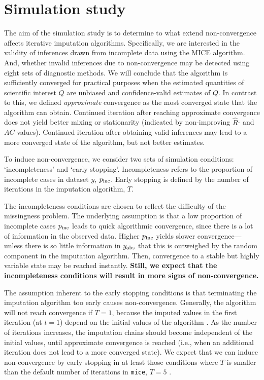 \documentclass[Royal,times,sageh]{sagej}
\begin{document}
\hypertarget{simulation-study}{%
\section{Simulation study}\label{simulation-study}}

The aim of the simulation study is to determine to what extend non-convergence affects iterative imputation algorithms. Specifically, we are interested in the validity of inferences drawn from incomplete data using the MICE algorithm. And, whether invalid inferences due to non-convergence may be detected using eight sets of diagnostic methods. We will conclude that the algorithm is sufficiently converged for practical purposes when the estimated quantities of scientific interest \(\bar{Q}\) are unbiased and confidence-valid estimates of \({Q}\). In contrast to this, we defined \emph{approximate} convergence as the most converged state that the algorithm can obtain. Continued iteration after reaching approximate convergence does not yield better mixing or stationarity (indicated by non-improving \(\widehat{R}\)- and \(AC\)-values). Continued iteration after obtaining valid inferences may lead to a more converged state of the algorithm, but not better estimates.

To induce non-convergence, we consider two sets of simulation conditions: `incompleteness' and `early stopping'. Incompleteness refers to the proportion of incomplete cases in dataset \(y\), \(p_{\rm inc}\). Early stopping is defined by the number of iterations in the imputation algorithm, \(T\).

The incompleteness conditions are chosen to reflect the difficulty of the missingness problem. The underlying assumption is that a low proportion of incomplete cases \(p_{\rm inc}\) leads to quick algorithmic convergence, since there is a lot of information in the observed data. Higher \(p_{\rm inc}\) yields slower convergence---unless there is so little information in \(y_{\rm obs}\) that this is outweighed by the random component in the imputation algorithm. Then, convergence to a stable but highly variable state may be reached instantly. \textbf{Still, we expect that the incompleteness conditions will result in more signs of non-convergence.}

The assumption inherent to the early stopping conditions is that terminating the imputation algorithm too early causes non-convergence. Generally, the algorithm will not reach convergence if \(T=1\), because the imputed values in the first iteration (at \(t=1\)) depend on the initial values of the algorithm \citep[which are sampled randomly from the set of observed datapoints;][]{buur18}. As the number of iterations increases, the imputation chains should become independent of the initial values, until approximate convergence is reached (i.e., when an additional iteration does not lead to a more converged state). We expect that we can induce non-convergence by early stopping in at least those conditions where \(T\) is smaller than the default number of iterations in \texttt{mice}, \(T=5\) \citep{mice}.
\end{document}
